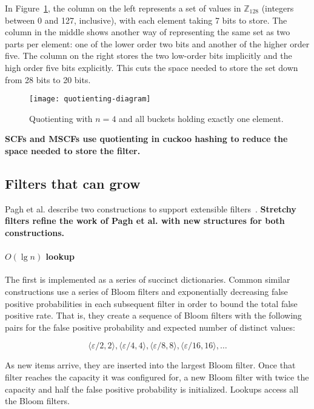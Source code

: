 \documentclass[letterpaper,twocolumn,10pt]{article}
\newcommand{\ints}{\mathbb{Z}}
\newcommand{\etal}{et al.}
\newcommand{\Taffy}{Stretchy}
\newcommand{\TCF}{SCF}
\newcommand{\MTCF}{MSCF}
\newcommand{\Taffy}{Taffy}
\newcommand{\TCF}{TCF}
\newcommand{\MTCF}{MTCF}
\begin{document}
In Figure~\ref{quotienting-figure}, the column on the left represents a set of values in $\ints_{128}$ (integers between 0 and 127, inclusive), with each element taking 7 bits to store.
The column in the middle shows another way of representing the same set as two parts per element: one of the lower order two bits and another of the higher order five.
The column on the right stores the two low-order bits implicitly and the high order five bits explicitly.
This cuts the space needed to store the set down from 28 bits to 20 bits.

\begin{figure}[b!]
\texttt{[image: quotienting-diagram]}
\caption{\label{quotienting-figure}
Quotienting with $n=4$ and all buckets holding exactly one element.
}
\end{figure}

{\bf \TCF{}s and \MTCF{}s use quotienting in cuckoo hashing to reduce the space needed to store the filter.}

\subsection{Filters that can grow}
\label{filters-that-grow}

Pagh \etal{} describe two constructions to support extensible filters~\cite{psw}.
{\bf \Taffy{} filters refine the work of Pagh \etal{} with new structures for both constructions.}

\paragraph{$O(\lg n)$ lookup}
The first is implemented as a series of succinct dictionaries.
Common similar constructions use a series of Bloom filters and exponentially decreasing false positive probabilities in each subsequent filter in order to bound the total false positive rate.
That is, they create a sequence of Bloom filters with the following pairs for the false positive probability and expected number of distinct values:

\[
\langle \varepsilon / 2, 2 \rangle,
 \langle \varepsilon / 4, 4 \rangle,
 \langle \varepsilon / 8, 8 \rangle,
 \langle \varepsilon / 16, 16 \rangle,
 \ldots
\]

As new items arrive, they are inserted into the largest Bloom filter.
Once that filter reaches the capacity it was configured for, a new Bloom filter with twice the capacity and half the false positive probability is initialized.
Lookups access all the Bloom filters.
\end{document}
